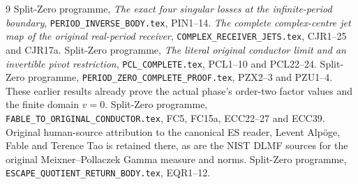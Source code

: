 \documentclass[11pt]{article}
\begin{document}
\begin{thebibliography}{9}
 Split-Zero programme, \emph{The exact four singular
losses at the infinite-period boundary},
\texttt{PERIOD\_INVERSE\_BODY.tex}, PIN1--14.
 \emph{The complete complex-centre jet map of the
original real-period receiver},
\texttt{COMPLEX\_RECEIVER\_JETS.tex}, CJR1--25 and CJR17a.
 Split-Zero programme, \emph{The literal original
conductor limit and an invertible pivot restriction},
\texttt{PCL\_COMPLETE.tex}, PCL1--10 and PCL22--24.
 Split-Zero programme,
\texttt{PERIOD\_ZERO\_COMPLETE\_PROOF.tex}, PZX2--3 and
PZU1--4. These earlier results already prove the actual phase's
order-two factor values and the finite domain $v=0$.
 Split-Zero programme,
\texttt{FABLE\_TO\_ORIGINAL\_CONDUCTOR.tex}, FC5, FC15a,
ECC22--27 and ECC39. Original human-source attribution to the
canonical ES reader, Levent Alp\"oge, Fable and Terence Tao is
retained there, as are the NIST DLMF sources for the original
Meixner--Pollaczek Gamma measure and norms.
 Split-Zero programme,
\texttt{ESCAPE\_QUOTIENT\_RETURN\_BODY.tex}, EQR1--12.
\end{thebibliography}
\end{document}
